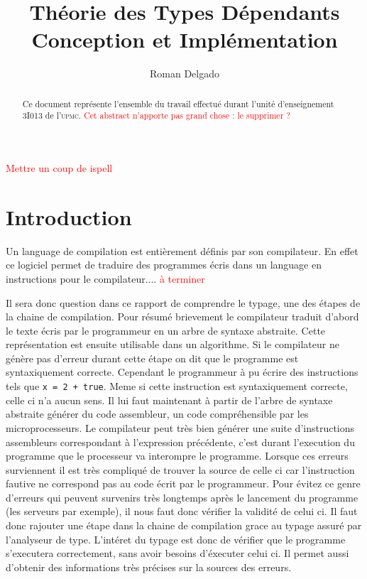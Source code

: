 \documentclass {article}
\title{Théorie des Types Dépendants\\Conception et Implémentation}
\author{Roman Delgado}
\date{}
\theoremstyle{definition}
\theoremstyle{remark}
\newcommand{\todo}[1]{\textcolor{red}{#1}}
\begin{document}
\maketitle



\todo{Mettre un coup de ispell}

\begin{abstract} 
  Ce document représente l'ensemble du travail effectué durant l'unité d'enseignement 3I013 de l'\textsc{upmc}. \todo{Cet abstract n'apporte pas grand chose : le supprimer ?}
\end{abstract}

\setcounter{tocdepth}{2}
\tableofcontents

\clearpage


\section{Introduction}


Un language de compilation est entièrement définis par son compilateur. En effet ce logiciel permet de traduire
des programmes écris dans un language en instructions pour le compilateur.... \todo{à terminer}

Il sera donc question dans ce rapport de comprendre le typage, une des étapes de la chaine de compilation.
Pour résumé brievement le compilateur 
traduit d'abord le texte écris par le programmeur en un arbre de syntaxe abstraite. Cette représentation est ensuite utilisable
dans un algorithme.
Si le compilateur ne génère pas d'erreur durant cette étape on dit que le programme est syntaxiquement correcte. Cependant 
le programmeur à pu écrire des instructions tels que \lstinline!x = 2 + true!. Meme si cette instruction est syntaxiquement correcte, celle ci 
n'a aucun sens. Il lui faut maintenant à partir de l'arbre de syntaxe abstraite générer du code assembleur, un code compréhensible 
par les microprocesseurs. Le compilateur peut très bien générer une suite d'instructions assembleurs correspondant à l'expression 
précédente, c'est durant l'execution du programme que le processeur va interompre le programme. Lorsque ces erreurs surviennent il est 
très compliqué de trouver la source de celle ci car l'instruction fautive ne correspond pas au code écrit par le programmeur. 
Pour évitez ce genre d'erreurs qui peuvent survenirs très longtemps après le lancement du programme (les serveurs par exemple), 
il nous faut donc vérifier la validité de celui ci. Il faut donc rajouter une étape dans la chaine de compilation grace au typage 
assuré par l'analyseur de type.
L'intéret du typage est donc de vérifier que le programme s'executera correctement, sans avoir besoins d'éxecuter celui ci. 
Il permet aussi d'obtenir des informations très précises sur la sources des erreurs.
\end{document}
